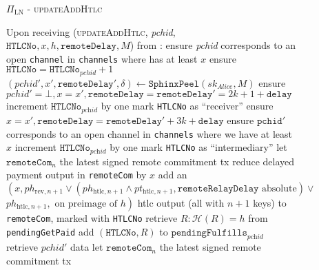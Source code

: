   \begin{figure}[H]
    \begin{protocolbox}{$\Pi_{\mathrm{LN}}$ - \textsc{updateAddHtlc}}
      \begin{algorithmic}[1]
        \State Upon receiving (\textsc{updateAddHtlc}, \textit{pchid},
        $\mathtt{HTLCNo}, x, h, \mathtt{remoteDelay}, M$) from \bob:
        \Indent
          \State ensure \textit{pchid} corresponds to an open \texttt{channel}
          in \texttt{channels} where \bob{} has at least $x$
          \State ensure $\mathtt{HTLCNo} = \mathtt{HTLCNo}_{\mathit{pchid}} + 1$
          \State $\left(\mathit{pchid}', x', \mathtt{remoteDelay}',
          \delta\right) \gets \mathtt{SphinxPeel}\left(sk_{\textit{Alice}},
          M\right)$
            \State ensure $\mathit{pchid}' = \bot, x = x', \mathtt{remoteDelay}
            = \mathtt{remoteDelay}' = 2k + 1 + \mathtt{delay}$
            \State increment $\mathtt{HTLCNo}_{\textit{pchid}}$ by one
            \State mark \texttt{HTLCNo} as ``receiver''
          \Else {}
            \State ensure $x = x', \mathtt{remoteDelay} = \mathtt{remoteDelay}'
            + 3k + \mathtt{delay}$
            \State ensure $\mathtt{pchid}'$ corresponds to an open channel in
            \texttt{channels} where we have at least $x$
            \State increment $\mathtt{HTLCNo}_{\textit{pchid}}$ by one
            \State mark \texttt{HTLCNo} as ``intermediary''
          \EndIf
          \State let $\mathtt{remoteCom}_n$ the latest signed remote commitment
          tx
          \State reduce delayed payment output in \texttt{remoteCom} by $x$
          \State add an $\left(x, ph_{\mathrm{rev}, n+1} \vee
          \left(ph_{\mathrm{htlc}, n+1} \wedge pt_{\mathrm{htlc}, n+1},
          \mathtt{remoteRelayDelay} \text{ absolute}\right) \vee\right.$
          $\left.ph_{\mathrm{htlc}, n+1}, \text{ on preimage of } h\right)$ htlc
          output (all with $n+1$ keys) to \texttt{remoteCom}, marked with
          \texttt{HTLCNo}
            \State retrieve $R : \mathcal{H}\left(R\right) = h$ from
            \texttt{pendingGetPaid}
            \State add $\left(\mathtt{HTLCNo}, R\right)$ to
            $\mathtt{pendingFulfills}_{\textit{pchid}}$
           
            \State retrieve $\mathit{pchid}'$ data
            \State let $\mathtt{remoteCom}_n$ the latest signed remote
            commitment tx

\end{algorithmic}
\end{protocolbox}
\end{figure}
